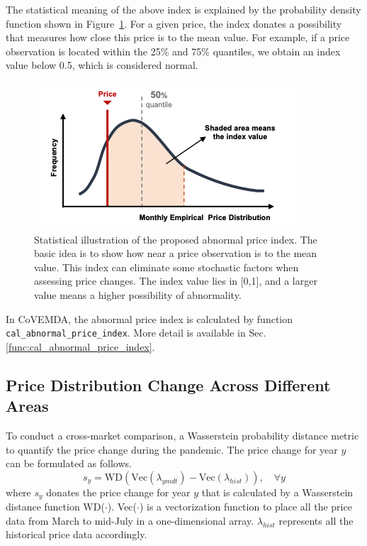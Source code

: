\documentclass[10pt]{article}
\newcommand{\covemda}{CoVEMDA}
\numberwithin{equation}{section}
\numberwithin{table}{section}
\numberwithin{figure}{section}
\begin{document}
The statistical meaning of the above index is explained by the probability density function shown in Figure~\ref{fig:abnormal_price_index}. For a given price, the index donates a possibility that measures how close this price is to the mean value. For example, if a price observation is located within the 25\% and 75\% quantiles, we obtain an index value below 0.5, which is considered normal.
\begin{figure}
  \centering
  \includegraphics[width=.8\textwidth]{figures/abnormal_price_index.png}
  \caption{Statistical illustration of the proposed abnormal price index. The basic idea is to show how near a price observation is to the mean value. This index can eliminate some stochastic factors when assessing price changes. The index value lies in [0,1], and a larger value means a higher possibility of abnormality.}
  \label{fig:abnormal_price_index}
\end{figure}

In \covemda{}, the abnormal price index is calculated by function \verb!cal_abnormal_price_index!. More detail is available in Sec.\ref{func:cal_abnormal_price_index}.

\subsection{Price Distribution Change Across Different Areas}\label{subsec:cal_distribution_diff}

To conduct a cross-market comparison, a Wasserstein probability distance \cite{carrillo2004wasserstein}\cite{kantorovich2006translocation} metric to quantify the price change during the pandemic. The price change for year $y$ can be formulated as follows.
\begin{equation*}
    s_y=\text{WD}(\text{Vec}(\lambda_{ymdt})-\text{Vec}(\lambda_{hist})),\quad\forall y    
\end{equation*}
where $s_y$ donates the price change for year $y$ that is calculated by a Wasserstein distance function WD($\cdot$). Vec($\cdot$) is a vectorization function to place all the price data from March to mid-July in a one-dimensional array. $\lambda_{hist}$ represents all the historical price data accordingly.
\end{document}
